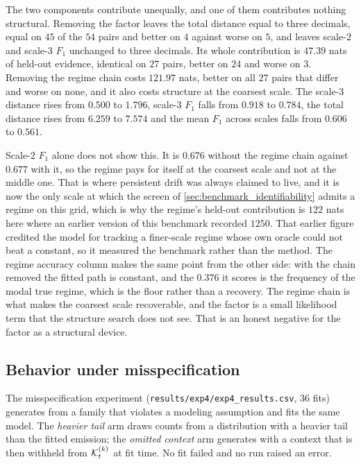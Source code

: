 The two components contribute unequally, and one of them contributes nothing
structural. Removing the factor leaves the total distance equal to three
decimals, equal on $45$ of the $54$ pairs and better on $4$ against worse on
$5$, and leaves scale-$2$ and scale-$3$ $F_1$ unchanged to three decimals. Its
whole contribution is $47.39$ nats of held-out evidence, identical on $27$
pairs, better on $24$ and worse on $3$. Removing the regime chain costs
$121.97$ nats, better on all $27$ pairs that differ and worse on none, and it
also costs structure at the coarsest scale. The scale-$3$ distance rises from
$0.500$ to $1.796$, scale-$3$ $F_1$ falls from $0.918$ to $0.784$, the total
distance rises from $6.259$ to $7.574$ and the mean $F_1$ across scales falls
from $0.606$ to $0.561$.

Scale-$2$ $F_1$ alone does not show this. It is $0.676$ without the regime
chain against $0.677$ with it, so the regime pays for itself at the coarsest
scale and not at the middle one. That is where persistent drift was always
claimed to live, and it is now the only scale at which the screen of
\cref{sec:benchmark_identifiability} admits a regime on this grid, which is why
the regime's held-out contribution is $122$ nats here where an earlier version
of this benchmark recorded $1250$. That earlier figure credited the model for
tracking a finer-scale regime whose own oracle could not beat a constant, so it
measured the benchmark rather than the method. The regime accuracy column makes
the same point from the other side: with the chain removed the fitted path is
constant, and the $0.376$ it scores is the frequency of the modal true regime,
which is the floor rather than a recovery. The regime chain is what makes the
coarsest scale recoverable, and the factor is a small likelihood term that the
structure search does not see. That is an honest negative for the factor as a
structural device.

\subsection{Behavior under misspecification}
\label{sec:results:misspec}

The misspecification experiment
(\texttt{results/exp4/exp4\_results.csv}, $36$ fits) generates from a family
that violates a modeling assumption and fits the same model. The
\emph{heavier tail} arm draws counts from a distribution with a heavier tail
than the fitted emission; the \emph{omitted context} arm generates with a
context that is then withheld from ${\mathcal{K}}_t^{(k)}$ at fit time. No fit failed and
no run raised an error.

